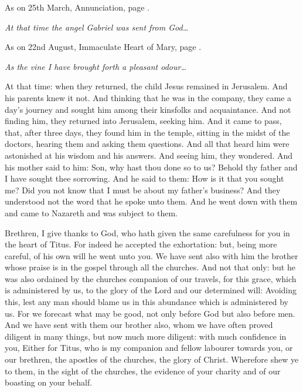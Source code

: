 As on 25th March, Annunciation, page \pageref{Go.angelus}.

\emph{At that time the angel Gabriel was sent from God\ldots}

\bigskip




As on 22nd August, Immaculate Heart of Mary, page \pageref{Ep.immacheart}.

\emph{As the vine I have brought forth a pleasant odour\ldots}


At that time: when they returned, the
child Jesus remained in Jerusalem. And his parents knew it not.  And thinking
that he was in the company, they came a day's journey and sought him among
their kinsfolks and acquaintance.  And not finding him, they returned into
Jerusalem, seeking him.  And it came to pass, that, after three days, they
found him in the temple, sitting in the midst of the doctors, hearing them and
asking them questions.  And all that heard him were astonished at his wisdom
and his answers.  And seeing him, they wondered. And his mother said to him:
Son, why hast thou done so to us? Behold thy father and I have sought thee
sorrowing.  And he said to them: How is it that you sought me? Did you not know
that I must be about my father's business?  And they understood not the word
that he spoke unto them.  And he went down with them and came to Nazareth and
was subject to them. 

\bigskip




Brethren, I give thanks to God, who hath given the same carefulness for you
in the heart of Titus.
For indeed he accepted the exhortation: but, being more careful,
of his own will he went unto you.
We have sent also with him the brother whose praise is in the
gospel through all the churches.
And not that only: but he was also ordained by the churches
companion of our travels, for this grace, which is administered by us,
to the glory of the Lord and our determined will:
Avoiding this, lest any man should blame us in this abundance
which is administered by us.
For we forecast what may be good, not only before God but also
before men.
And we have sent with them our brother also, whom we have often
proved diligent in many things, but now much more diligent: with much
confidence in you,
Either for Titus, who is my companion and fellow labourer towards
you, or our brethren, the apostles of the churches, the glory of Christ.
Wherefore shew ye to them, in the sight of the churches, the
evidence of your charity and of our boasting on your behalf.


